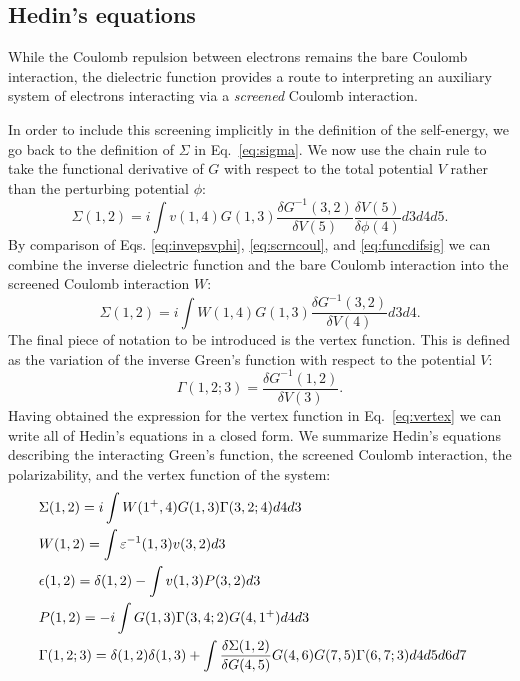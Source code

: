 \subsection{Hedin's equations}
\noindent
While the Coulomb repulsion between electrons remains the bare Coulomb interaction, 
the dielectric function provides a route to interpreting 
an auxiliary system of electrons interacting via a \emph{screened} Coulomb interaction.

In order to include this screening implicitly in the definition of the self-energy, we 
go back to the definition of $\Sigma$ in Eq.~\ref{eq:sigma}. We now use the chain 
rule to take the functional derivative of $G$ with 
respect to the total potential $V$ rather than the perturbing potential $\phi$:
%
\begin{equation}
\label{eq:funcdifsig}
\Sigma(1,2) =  i\int v(1,4) G(1,3)\frac{\delta G^{-1}(3,2)}{\delta V(5)}\frac{\delta V(5)}{\delta\phi(4)}d3d4d5.
\end{equation}
%
By comparison of Eqs. \ref{eq:invepsvphi}, \ref{eq:scrncoul}, and \ref{eq:funcdifsig} we can combine
the inverse dielectric function and the bare Coulomb interaction into the screened Coulomb interaction $W$:
%
\begin{equation}
\Sigma(1,2) =  i\int W(1,4)G(1,3)\frac{\delta G^{-1}(3,2)}{\delta V(4)}d3d4.
\end{equation}
%
The final piece of notation to be introduced is the vertex function. This is defined as the variation 
of the inverse Green's function with respect to the potential $V$:
%
\begin{equation}
\label{eq:vertex}
\Gamma(1,2;3) = \frac{\delta G^{-1}(1,2)}{\delta V(3)}.
\end{equation}
%
Having obtained the expression for the vertex function in Eq.~\ref{eq:vertex} we
can write all of Hedin's equations in a closed form.
We summarize Hedin's equations describing the interacting Green's function,
the screened Coulomb interaction, the polarizability, and the vertex function of the system:
%
\begin{align}
\label{eq:hedinsig}
&\Sigma(1,2)   = i\int W(1^{+},4)G(1,3)\Gamma(3,2;4)d4d3 &   \\
\label{eq:hedinw}
&W(1,2)        =  \int \varepsilon^{-1}(1,3)v(3,2) d3 &               \\
\label{eq:hedineps}
&\epsilon(1,2) =  \delta(1,2) - \int v(1,3)P(3,2)d3 &        \\
\label{eq:hedinpol}
&P(1,2)        = -i\int G(1,3)\Gamma(3,4;2) G(4,1^{+})d4d3 & \\
\label{eq:hedinvert}
&\Gamma(1,2;3) = \delta(1,2)\delta(1,3) + \int \frac{\delta\Sigma(1,2)}{\delta G(4,5)}G(4,6)G(7,5) \Gamma(6,7;3)d4d5d6d7 & 
\end{align}

